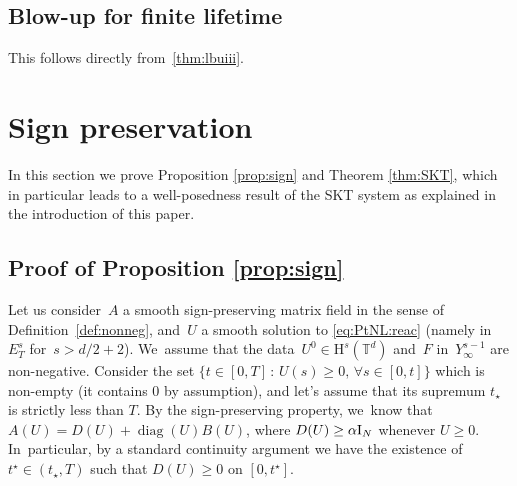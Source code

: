 \documentclass[JEP,XML,SOM,Unicode,published]{cedram}
\DeclareMathOperator{\diag}{diag}
\theoremstyle{definition}
\newcommand\T{\mathbb{T}}
\renewcommand\H{\mathrm{H}}
\begin{document}
\subsection{Blow-up for finite lifetime}
This follows directly from~\eqref{thm:lbuiii}.

\section{Sign preservation}\label{proofprop:sign}
In this section we prove Proposition \ref{prop:sign} and Theorem \ref{thm:SKT}, which in particular leads to a well-posedness result of the SKT system as explained in the introduction of this paper.
\subsection{Proof of Proposition \ref{prop:sign}}
Let us consider~$A$ a smooth sign-preserving matrix field in the sense of Definition~\ref{def:nonneg}, and~$U$ a smooth solution to \eqref{eq:PtNL:reac} (namely in $E^s_T$ for~$s>d/2+2$). We~assume that the data~$U^0\in\H^s(\T^d)$ and~$F$ in~$Y_\infty^{s-1}$ are non-negative. Consider the set $\{t \in[0,T] \,:\, U(s)\geq 0,\, \forall s\in[0,t]\}$ which is non-empty (it contains $0$ by assumption), and let's assume that its supremum $t_\star$ is strictly less than $T$. By the sign-preserving property, we~know that $A(U) = D(U)+ \diag(U)B(U)$, where $D(U)\geq \alpha \textnormal{I}_N$ whenever $U\geq 0$. In~particular, by a standard continuity argument we have the existence of $t^\star\in (t_\star,T)$ such that $D(U)\geq 0$ on $[0,t^\star]$.
\end{document}
